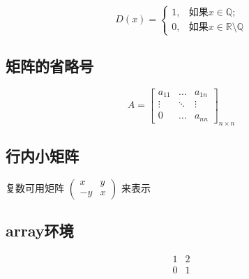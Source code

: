 \begin{equation*}
D(x)=\begin{cases}
1, & \text{如果} x \in \mathbb{Q};\\
0, & \text{如果} x \in \mathbb{R}\setminus\mathbb{Q}
\end{cases}
\end{equation*}

\subsection{矩阵的省略号}
\[
A = \begin{bmatrix}
a_{11} & \dots & a_{1n}\\
\vdots& \ddots & \vdots \\
0 & \dots & a_{nn}
\end{bmatrix}_{n \times n}
\]

\subsection{行内小矩阵}
复数可用矩阵
\begin{math}
    \left(
    \begin{smallmatrix}
    x & y \\ -y & x
    \end{smallmatrix}
    \right)
\end{math}
来表示

\subsection{array环境}
\[
\begin{array}{c|c}
1 & 2\\
\hline
0　& 1
\end{array}
\]
